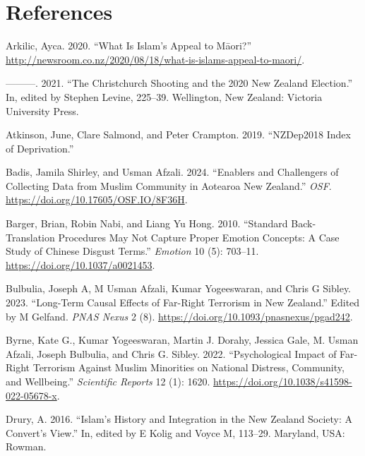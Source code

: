 \documentclass[
]{interact}
\newlength{\cslhangindent}
\newenvironment{CSLReferences}[2] %
 {\begin{list}{}{%
  \setlength{\itemindent}{0pt}
  \setlength{\leftmargin}{0pt}
  \setlength{\parsep}{0pt}
  \ifodd #1
   \setlength{\leftmargin}{\cslhangindent}
   \setlength{\itemindent}{-1\cslhangindent}
  \fi
  \setlength{\itemsep}{#2\baselineskip}}}
 {\end{list}}
\begin{document}
\newpage{}

\section*{References}\label{references}

\label{refs}
\begin{CSLReferences}{1}{0}
Arkilic, Ayca. 2020. {``What Is {I}slam's Appeal to {M}{ā}ori?''}
\url{http://newsroom.co.nz/2020/08/18/what-is-islams-appeal-to-maori/}.

---------. 2021. {``The {C}hristchurch Shooting and the 2020 {N}ew
{Z}ealand Election.''} In, edited by Stephen Levine, 225--39.
Wellington, New Zealand: Victoria University Press.

Atkinson, June, Clare Salmond, and Peter Crampton. 2019. {``NZDep2018
Index of Deprivation.''}

Badis, Jamila Shirley, and Usman Afzali. 2024. {``Enablers and
Challengers of Collecting Data from Muslim Community in Aotearoa New
Zealand.''} \emph{OSF}. \url{https://doi.org/10.17605/OSF.IO/8F36H}.

Barger, Brian, Robin Nabi, and Liang Yu Hong. 2010. {``Standard
Back-Translation Procedures May Not Capture Proper Emotion Concepts: A
Case Study of Chinese Disgust Terms.''} \emph{Emotion} 10 (5): 703--11.
\url{https://doi.org/10.1037/a0021453}.

Bulbulia, Joseph A, M Usman Afzali, Kumar Yogeeswaran, and Chris G
Sibley. 2023. {``Long-Term Causal Effects of Far-Right Terrorism in New
Zealand.''} Edited by M Gelfand. \emph{PNAS Nexus} 2 (8).
\url{https://doi.org/10.1093/pnasnexus/pgad242}.

Byrne, Kate G., Kumar Yogeeswaran, Martin J. Dorahy, Jessica Gale, M.
Usman Afzali, Joseph Bulbulia, and Chris G. Sibley. 2022.
{``Psychological Impact of Far-Right Terrorism Against Muslim Minorities
on National Distress, Community, and Wellbeing.''} \emph{Scientific
Reports} 12 (1): 1620. \url{https://doi.org/10.1038/s41598-022-05678-x}.

Drury, A. 2016. {``{Islam{'}s} History and Integration in the {N}ew
{Z}ealand Society: A {Convert{'}s} View.''} In, edited by E Kolig and
Voyce M, 113--29. Maryland, USA: Rowman.


\end{CSLReferences}
\end{document}
